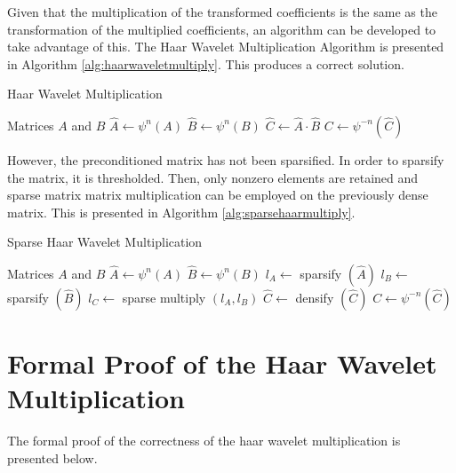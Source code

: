 Given that the multiplication of the transformed coefficients is the
same as the transformation of the multiplied coefficients, an
algorithm can be developed to take advantage of this. The Haar Wavelet
Multiplication Algorithm is presented in Algorithm
\ref{alg:haarwaveletmultiply}. This produces a correct solution. 

\begin{algorithm}
\caption{ Haar Wavelet Multiplication}
\label{alg:haarwaveletmultiply}
\begin{algorithmic}
\REQUIRE Matrices $A$ and $B$
\STATE $\hat A \leftarrow \psi^n(A)$
\STATE $\hat B \leftarrow \psi^n(B)$
\STATE $\hat C \leftarrow \hat A \cdot \hat B$
\STATE $C \leftarrow \psi^{-n}\left(\hat C\right)$
\end{algorithmic}
\end{algorithm}

However, the preconditioned matrix has not been sparsified. In order to
sparsify the matrix, it is thresholded. Then, only nonzero elements are
retained and sparse matrix matrix multiplication can be employed on the
previously dense matrix. This is presented in Algorithm \ref{alg:sparsehaarmultiply}.


\begin{algorithm}
\caption{ Sparse Haar Wavelet Multiplication}
\label{alg:sparsehaarmultiply}
\begin{algorithmic}
\REQUIRE Matrices $A$ and $B$
\STATE $\hat A \leftarrow \psi^n(A)$
\STATE $\hat B \leftarrow \psi^n(B)$
\STATE $l_A \leftarrow$ sparsify $\left(\hat A\right)$
\STATE $l_B \leftarrow$ sparsify $\left(\hat B\right)$
\STATE $l_C \leftarrow$ sparse multiply $\left(l_A, l_B \right)$
\STATE $\hat C \leftarrow$ densify $\left(\hat C \right)$
\STATE $C \leftarrow \psi^{-n}\left(\hat C\right)$
\end{algorithmic}
\end{algorithm}
	

\section{Formal Proof of the Haar Wavelet Multiplication}

The formal proof of the correctness of the haar wavelet multiplication is presented below.


